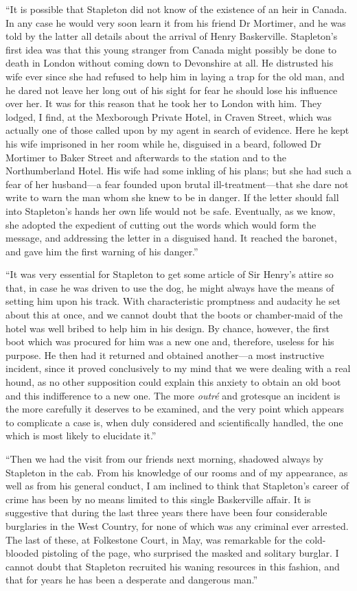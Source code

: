 \documentclass[paper=a5,BCOR=7mm,twoside,DIV=calc,12pt,usegeometry,openany,chapterprefix,endperiod,headings=big]{scrbook} %
\begin{document}
\enquote{It is possible that Stapleton did not know of the existence of an heir in Canada. In any case he would very soon learn it from his friend Dr Mortimer, and he was told by the latter all details about the arrival of Henry Baskerville. Stapleton's first idea was that this young stranger from Canada might possibly be done to death in London without coming down to Devonshire at all. He distrusted his wife ever since she had refused to help him in laying a trap for the old man, and he dared not leave her long out of his sight for fear he should lose his influence over her. It was for this reason that he took her to London with him. They lodged, I find, at the Mexborough Private Hotel, in Craven Street, which was actually one of those called upon by my agent in search of evidence. Here he kept his wife imprisoned in her room while he, disguised in a beard, followed Dr Mortimer to Baker Street and afterwards to the station and to the Northumberland Hotel. His wife had some inkling of his plans; but she had such a fear of her husband---a fear founded upon brutal ill-treatment---that she dare not write to warn the man whom she knew to be in danger. If the letter should fall into Stapleton's hands her own life would not be safe. Eventually, as we know, she adopted the expedient of cutting out the words which would form the message, and addressing the letter in a disguised hand. It reached the baronet, and gave him the first warning of his danger.}

\enquote{It was very essential for Stapleton to get some article of Sir Henry's attire so that, in case he was driven to use the dog, he might always have the means of setting him upon his track. With characteristic promptness and audacity he set about this at once, and we cannot doubt that the boots or chamber-maid of the hotel was well bribed to help him in his design. By chance, however, the first boot which was procured for him was a new one and, therefore, useless for his purpose. He then had it returned and obtained another---a most instructive incident, since it proved conclusively to my mind that we were dealing with a real hound, as no other supposition could explain this anxiety to obtain an old boot and this indifference to a new one. The more \textit{outré} and grotesque an incident is the more carefully it deserves to be examined, and the very point which appears to complicate a case is, when duly considered and scientifically handled, the one which is most likely to elucidate it.}

\enquote{Then we had the visit from our friends next morning, shadowed always by Stapleton in the cab. From his knowledge of our rooms and of my appearance, as well as from his general conduct, I am inclined to think that Stapleton's career of crime has been by no means limited to this single Baskerville affair. It is suggestive that during the last three years there have been four considerable burglaries in the West Country, for none of which was any criminal ever arrested. The last of these, at Folkestone Court, in May, was remarkable for the cold-blooded pistoling of the page, who surprised the masked and solitary burglar. I cannot doubt that Stapleton recruited his waning resources in this fashion, and that for years he has been a desperate and dangerous man.}
\end{document}
